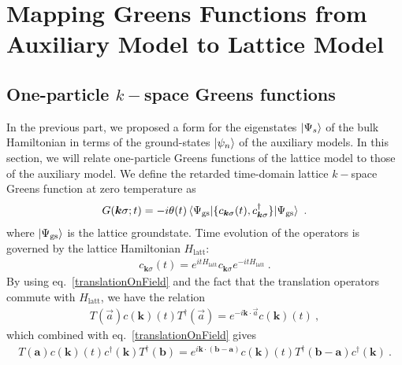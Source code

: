 \section{Mapping Greens Functions from Auxiliary Model to Lattice Model}\label{tilingGreensFunction}
\subsection{One-particle \(k-\)space Greens functions}\label{tileKspaceGreen}
In the previous part, we proposed a form for the eigenstates \(\ket{\Psi_s}\) of the bulk Hamiltonian in terms of the ground-states \(\ket{\psi_n}\) of the auxiliary models.
In this section, we will relate one-particle Greens functions of the lattice model to those of the auxiliary model. We define the retarded time-domain lattice \(k-\)space Greens function at zero temperature as
\begin{equation}\begin{aligned}
	G({\bm k}\sigma; t) = -i\theta(t) \braket{\Psi_\text{gs} | \{ c_{{\bm k}\sigma}(t), c^\dagger_{{\bm k}\sigma} \} | \Psi_\text{gs}}~.
\end{aligned}\end{equation}
where \(\ket{\Psi_\text{gs}}\) is the lattice groundstate. Time evolution of the operators is governed by the lattice Hamiltonian \(H_\text{latt}\):
\begin{equation}\begin{aligned}\label{heisenberg}
	c_{{\bm k}\sigma}(t) = e^{it H_\text{latt} }c_{{\bm k}\sigma}e^{-i t H_\text{latt}}~.
\end{aligned}\end{equation}
By using eq.~\ref{translationOnField} and the fact that the translation operators commute with \(H_\text{latt}\), we have the relation
\begin{equation}\begin{aligned}
	T\left(\vec a\right) c({\bm k})(t) T^\dagger\left(\vec a\right) = e^{-i{\bm k}\cdot\vec a}c({\bm k})(t)~,
\end{aligned}\end{equation}
which combined with eq.~\ref{translationOnField} gives
\begin{equation}\begin{aligned}\label{translationOnProduct}
	T\left(\bm a\right) c({\bm k})(t) c^\dagger({\bm k}) T^\dagger\left(\bm b\right) = e^{i{\bm k}\cdot(\bm b - \bm a)}c({\bm k})(t) T^\dagger({\bm b - \bm a}) c^\dagger({\bm k})~.
\end{aligned}\end{equation}



